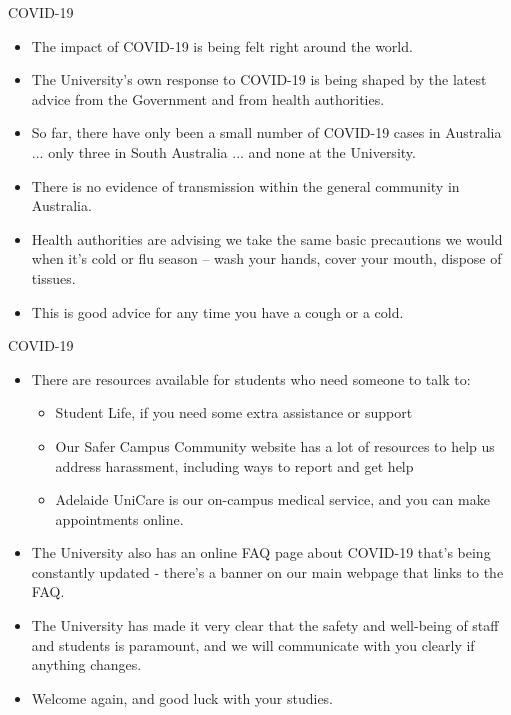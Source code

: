 \documentclass[11pt]{beamer}
\begin{document}
\begin{frame}{COVID-19}

	\begin{itemize}
		\item The impact of COVID-19 is being felt right around the world. 
		\item The University’s own response to COVID-19 is being shaped by the latest advice from the Government and from health authorities. 
		\item So far, there have only been a small number of COVID-19 cases in Australia ... only three in South Australia  ... and none at the University.	
		\item There is no evidence of transmission within the general community in Australia.
		\item Health authorities are advising we take the same basic precautions we would when it’s cold or flu season – wash your hands, cover your mouth, dispose of tissues.
		\item This is good advice for any time you have a cough or a cold.	
 
	\end{itemize}

\end{frame}

\begin{frame}{COVID-19}

	\begin{itemize}
		\item There are resources available for students who need someone to talk to:
		
		\begin{itemize}
			\item Student Life, if you need some extra assistance or support
			\item Our Safer Campus Community website has a lot of resources to help us address harassment, including ways to report and get help
			\item Adelaide UniCare is our on-campus medical service, and you can make appointments online.
		\end{itemize}
		
		\item The University also has an online FAQ page about COVID-19 that’s being constantly updated - there’s a banner on our main webpage that links to the FAQ.
		\item The University has made it very clear that the safety and well-being of staff and students is paramount, and we will communicate with you clearly if anything changes.
		\item Welcome again, and good luck with your studies.
	\end{itemize}

\end{frame}
\end{document}
